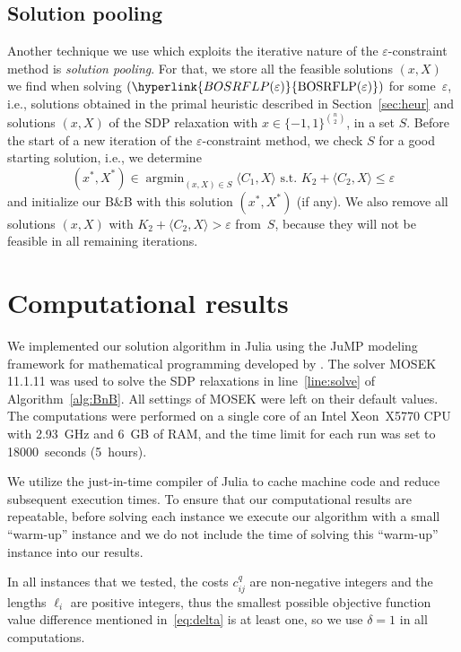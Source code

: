 \documentclass{article}
\newcommand{\myrefmath}[1]{(\hyperlink{#1}{\mathrm{#1}})}
\newcommand{\BB}{B\&B\xspace}
\DeclareMathOperator*{\argmin}{arg min}
\begin{document}
\subsection{Solution pooling}\label{sec:pooling}
Another technique we use which exploits the iterative nature of the $\varepsilon$-constraint method is \emph{solution pooling}. For that, we store all the feasible solutions $(x,X)$ we find when solving $\myrefmath{BOSRFLP(\varepsilon)}$ for some~$\varepsilon$, i.e., solutions obtained in the primal heuristic described in Section~\ref{sec:heur} and solutions $(x,X)$ of the SDP relaxation with $x \in \{-1,1\}^{\binom{n}{2}}$, in a set $S$. 
Before the start of a new iteration of the $\varepsilon$-constraint method, we check $S$ for a good starting solution, i.e., we determine
\[(x^*,X^*) \in \argmin_{(x,X) \in S} \langle C_1,X \rangle \text{ s.t. } K_2 + \langle C_2,X \rangle \leq \varepsilon\]
and initialize our \BB with this solution $(x^*,X^*)$ (if any). We also remove all solutions $(x,X)$ with $K_2 + \langle C_2,X \rangle > \varepsilon$ from~$S$, because they will not be feasible in all remaining iterations.

\section{Computational results}\label{sec:comp-results}

We implemented our solution algorithm in Julia using the JuMP modeling framework for mathematical programming developed by \citet{Lubin2023}. The solver MOSEK 11.1.11 was used to solve the SDP relaxations in line~\ref{line:solve} of Algorithm~\ref{alg:BnB}. All settings of MOSEK were left on their default values. The computations were performed on a single core of an Intel Xeon~X5770 CPU with 2.93~GHz and 6~GB of RAM, and the time limit for each run was set to 18000~seconds (5~hours).

We utilize the just-in-time compiler of Julia to cache machine code and reduce subsequent execution times. To ensure that our computational results are repeatable, before solving each instance we execute our algorithm with a small ``warm-up'' instance and we do not include the time of solving this ``warm-up'' instance into our results. 

In all instances that we tested, the costs $c_{ij}^q$ are non-negative integers and the lengths $\ell_i$ are positive integers, thus the smallest possible objective function value difference mentioned in~\eqref{eq:delta} is at least one, so we use $\delta=1$ in all computations.
\end{document}
